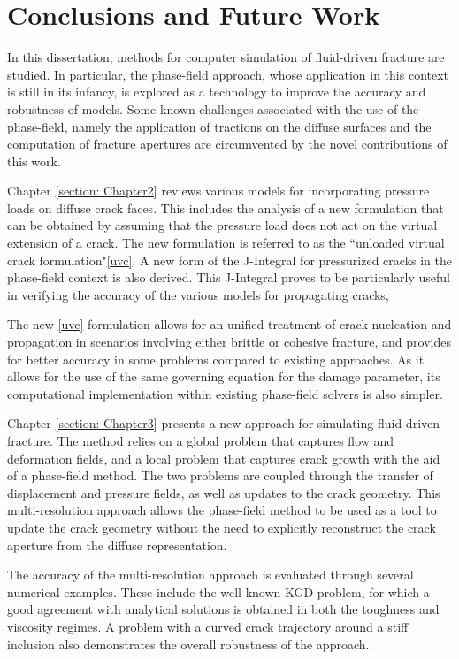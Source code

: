 \chapter{Conclusions and Future Work}
\label{section: Conclusions}

In this dissertation, methods for computer simulation of fluid-driven fracture are studied. In particular, the phase-field approach, whose application in this context is still in its infancy, is explored as a technology to improve the accuracy and robustness of models. Some known challenges associated with the use of the phase-field, namely the application of tractions on the diffuse surfaces and the computation of fracture apertures are circumvented by the novel contributions of this work. 

Chapter \ref{section: Chapter2} reviews various models for incorporating pressure loads on diffuse crack faces. This includes the analysis of a new formulation that can be obtained by assuming that the pressure load does not act on the virtual extension of a crack. The new formulation is referred to as the 
 ``unloaded virtual crack formulation"\eqref{uvc}. A new form of the J-Integral for pressurized cracks in the phase-field context is also derived. This J-Integral proves to be particularly useful in verifying the accuracy of the various models for propagating cracks,

The new \eqref{uvc} formulation allows for an unified treatment of crack nucleation and propagation in scenarios involving either brittle or cohesive fracture, and provides for better accuracy in some problems compared to existing approaches. As it allows for the use of the same governing equation for the damage parameter, its computational implementation within existing phase-field solvers is also simpler. 

Chapter \ref{section: Chapter3} presents a new approach for simulating fluid-driven fracture. The method relies on a global problem that captures flow and deformation fields, and a local problem that captures crack growth with the aid of a phase-field method. The two problems are coupled through the transfer of displacement and pressure fields, as well as updates to the crack geometry. This multi-resolution approach allows the phase-field method to be used as a tool to update the crack geometry without the need to explicitly reconstruct the crack aperture from the diffuse representation.  

The accuracy of the multi-resolution approach is evaluated through several numerical examples. These include the well-known KGD problem, for which a good agreement with analytical solutions is obtained in both the toughness and viscosity regimes. A problem with a curved crack trajectory around a stiff inclusion also demonstrates the overall robustness of the approach.  

